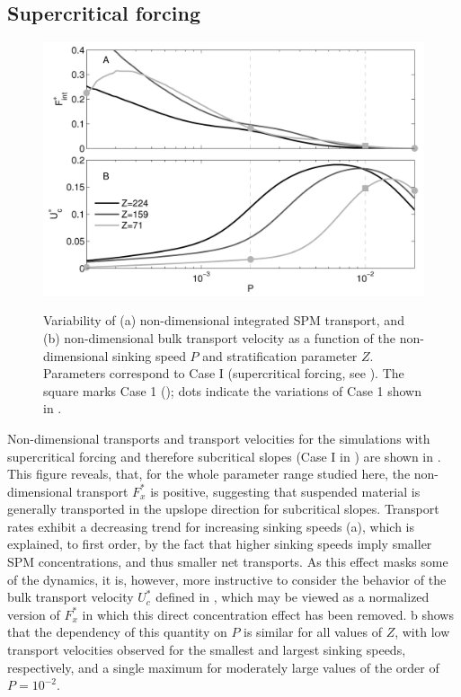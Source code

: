 \subsection{Supercritical forcing}
\begin{figure}[t]
  \noindent\includegraphics[width=29pc,angle=0]{bilder/subcrit.pdf}\\
  \caption{Variability of (a) non-dimensional integrated SPM
    transport, and (b) non-dimensional bulk transport velocity as a
    function of the non-dimensional sinking speed $P$ and
    stratification parameter $Z$. Parameters correspond to Case I
    (supercritical forcing, see ).  The square marks
    Case 1 (); dots indicate the variations of Case 1
    shown in .}\label{subcrit}
\end{figure}
Non-dimensional transports and transport velocities for the
simulations with supercritical forcing and therefore subcritical
slopes (Case I in ) are shown in . This
figure reveals, that, for the whole parameter range studied here, the
non-dimensional transport $F_x^\ast$ is positive, suggesting that
suspended material is generally transported in the upslope direction
for subcritical slopes. Transport rates exhibit a decreasing trend for
increasing sinking speeds (a), which is explained, to
first order, by the fact that higher sinking speeds imply smaller SPM
concentrations, and thus smaller net transports. As this effect masks
some of the dynamics, it is, however, more instructive to consider the
behavior of the bulk transport velocity $U_c^\ast$ defined in
, which may be viewed as a normalized version of $F_x^\ast$ in
which this direct concentration effect has been
removed. b shows that the dependency of this quantity on
$P$ is similar for all values of $Z$, with low transport velocities
observed for the smallest and largest sinking speeds, respectively,
and a single maximum for moderately large values of the order of
$P=10^{-2}$.

